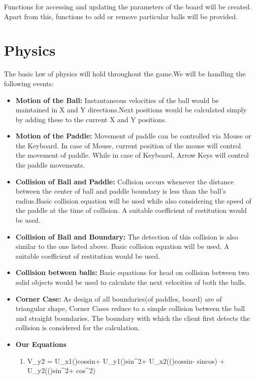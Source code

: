 \documentclass{article}
\begin{document}
Functions for accessing and updating the parameters of the board will be created. Apart from this, functions to add or remove particular balls will be provided.

			\section{Physics} 
			\par\noindent The basic law of physics will hold throughout the game.We will be handling the following events:
			\begin{itemize}
			\item \textbf{Motion of the Ball:} Instantaneous velocities of the ball would be maintained in X and Y directions.Next positions would be calculated simply by adding these to the current X and Y positions. 
			\item \textbf{Motion of the Paddle:} Movement of paddle can be controlled via Mouse or the Keyboard. In case of Mouse, current position of the mouse will control the movement of paddle. While in case of Keyboard, Arrow Keys will control the paddle movements.
			\item \textbf{Collision of Ball and Paddle:} Collision occurs whenever the distance between the center of ball and paddle boundary is less than the ball's radius.Basic collision equation will be used while also considering the speed of the paddle at the time of collision. A suitable coefficient of restitution would be used.
			\item \textbf{Collision of Ball and Boundary:} The detection of this collision is also similar to the one listed above. Basic collision equation will be used. A suitable coefficient of restitution would be used.
			\item \textbf{Collision between balls:} Basic equations for head on collision between two solid objects would be used to calculate the next velocities of both the balls.
			\item \textbf{Corner Case:} As design of all boundaries(of paddles, board) are of triangular shape, Corner Cases reduce to a simple collision between the ball and straight boundaries. The boundary with which the client first detects the collision is considered for the calculation.
			\item \textbf{Our Equations}
			\begin{enumerate}
				\item V_{y2} = U_{x1}()cos\theta sin\theta + U_{y1}()sin^2\theta + U_{x2}(()cos\theta sin\theta - sin\theta cos\theta) + U_{y2}(()sin^2\theta + cos^2\theta)

\end{enumerate}
\end{itemize}
\end{document}
